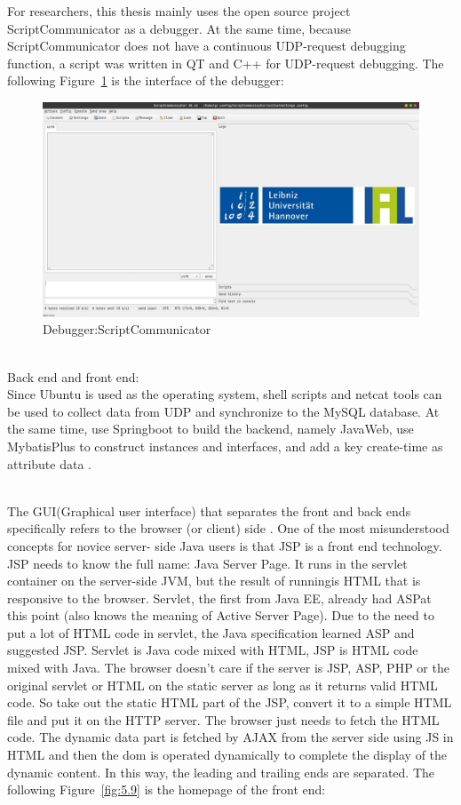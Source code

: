 For researchers, this thesis mainly uses the open source project ScriptCommunicator as a debugger. At the same time, because ScriptCommunicator does not have a continuous UDP-request debugging function, a script was written in QT and C++ for UDP-request debugging.
The following Figure~\ref{fig:5.8} is the interface of the debugger:

\begin{figure}[!ht]
	\centering
	\includegraphics[width=16cm]{grafiken/5.8.pdf}
	\caption{Debugger:ScriptCommunicator} 
	\label{fig:5.8}
\end{figure}
\FloatBarrier
\\
Back end and front end:
\\
Since Ubuntu is used as the operating system, shell scripts and netcat tools can be used to collect data from UDP and synchronize to the MySQL database. At the same time, use Springboot to build the backend, namely JavaWeb, use MybatisPlus to construct instances and interfaces, and add a key create-time as attribute data \cite{gutierrez2019data}.

\\
The GUI(Graphical user interface) that separates the front and back ends specifically refers to the browser (or client) side \cite{yunrui2018front}. One of the most misunderstood concepts for novice server-
side Java users is that JSP is a front end technology. JSP needs to know the full name: Java Server Page. It runs in the servlet container on the server-side JVM, but the result of runningis HTML that is responsive to the browser. Servlet, the first from Java EE, already had ASPat this point (also knows the meaning of Active Server Page). Due to the need to put a lot of HTML code in servlet, the Java specification learned ASP and suggested JSP. Servlet is Java code mixed with HTML, JSP is HTML code mixed with Java. The browser doesn’t care if the server is JSP, ASP, PHP or the original servlet or HTML on the static server as long as it returns valid HTML code. So take out the static HTML part of the JSP, convert it to a simple
HTML file and put it on the HTTP server. The browser just needs to fetch the HTML code. The dynamic data part is fetched by AJAX from the server side using JS in HTML and then the dom is operated dynamically to complete the display of the dynamic content. In this way, the leading and trailing ends are separated.
The following Figure~\ref{fig:5.9}  is the homepage of the front end:



